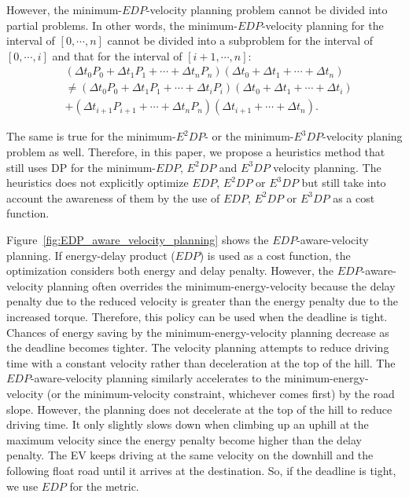 \documentclass{IEEEtran}
\begin{document}
However, the minimum-$EDP$-velocity planning problem cannot be divided into partial problems. In other words, the minimum-$EDP$-velocity planning for the interval of $[0, \cdots, n]$ cannot be divided into a subproblem for the interval of $[0, \cdots,  i]$ and that for the interval of $[i+1,\cdots, n]$:
%
\begin{align}
&(\Delta t_0 P_0 + \Delta t_1 P_1 + \cdots + \Delta t_n P_n)(\Delta t_0 + \Delta t_1 + \cdots + \Delta t_n) \nonumber \\ 
&\neq (\Delta t_0 P_0 + \Delta t_1 P_1 + \cdots + \Delta t_i P_i)(\Delta t_0 + \Delta t_1 + \cdots + \Delta t_i) \nonumber \\
&+ (\Delta t_{i+1} P_{i+1} + \cdots + \Delta t_n P_n)(\Delta t_{i+1} + \cdots + \Delta t_n).
\end{align} 

The same is true for the minimum-$E^2DP$- or the minimum-$E^3DP$-velocity planing problem as well. Therefore, in this paper, we propose a heuristics method that still uses DP for the minimum-$EDP$, $E^2DP$ and $E^3DP$ velocity planning. The heuristics does not explicitly optimize $EDP$, $E^2DP$ or $E^3DP$ but still take into account the awareness of them by the use of $EDP$, $E^2DP$ or $E^3DP$ as a cost function. 

Figure~\ref{fig:EDP_aware_velocity_planning} shows the $EDP$-aware-velocity planning. 
If energy-delay product ($EDP$) is used as a cost function, the optimization considers both energy and delay penalty. However, the $EDP$-aware-velocity planning often overrides the minimum-energy-velocity because the delay penalty due to the reduced velocity is greater than the energy penalty due to the increased torque. Therefore, this policy can be used when the deadline is tight. Chances of energy saving by the minimum-energy-velocity planning decrease as the deadline becomes tighter. 
The velocity planning attempts to reduce driving time with a constant velocity rather than deceleration at the top of the hill. 
%
The $EDP$-aware-velocity planning similarly accelerates to the minimum-energy-velocity (or the minimum-velocity constraint, whichever comes first) by the road slope. However, the planning does not decelerate at the top of the hill to reduce driving time. It only slightly slows down when climbing up an uphill at the maximum velocity since the energy penalty become higher than the delay penalty. The EV keeps driving at the same velocity on the downhill and the following float road until it arrives at the destination. So, if the deadline is tight, we use $EDP$ for the metric.
\end{document}
